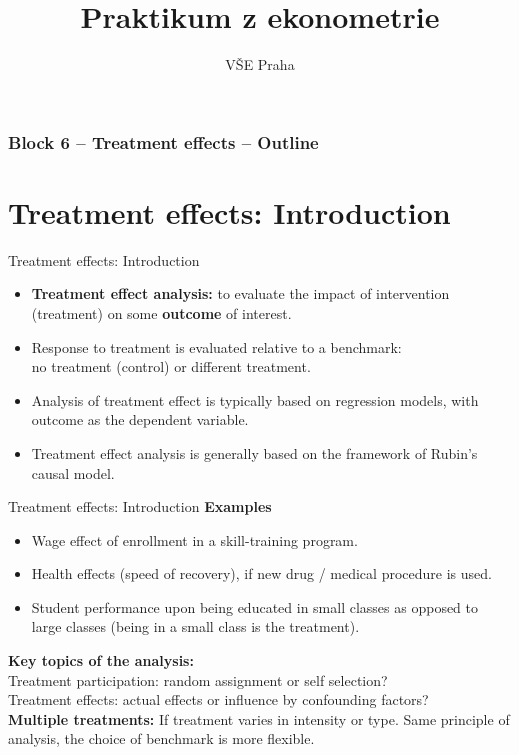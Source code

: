\documentclass{beamer}
\title[Block 6]{Praktikum z ekonometrie}
\author{VŠE Praha}
\institute[4EK417] 
{
\medskip
\textit{Tomáš Formánek} %
}
\date{} %
\begin{document}
\begin{frame}
\titlepage %
\end{frame}
\begin{frame}
\frametitle{Block 6 – Treatment effects – Outline
} 
\tableofcontents 
\end{frame}
\section{Treatment effects: Introduction}
\begin{frame}{Treatment effects: Introduction}
\begin{itemize}
    \item \textbf{Treatment effect analysis:} to evaluate the impact of intervention (treatment) on some \textbf{outcome} of interest.
    \bigskip
    \item Response to treatment is evaluated relative to a benchmark:  \\no treatment (control) or different treatment. 
    \bigskip
    \item Analysis of treatment effect is typically based on regression models, with outcome as the dependent variable.
    \bigskip
    \item Treatment effect analysis is generally based on the framework of Rubin's causal model. 
\end{itemize}
\end{frame}
\begin{frame}{Treatment effects: Introduction}
\textbf{Examples}\\ \medskip
\begin{itemize}
    \item Wage effect of enrollment in a skill-training program.
    \medskip
    \item Health effects (speed of recovery), if new drug / medical procedure is used.
    \medskip
    \item Student performance upon being educated in small classes as opposed to large classes (being in a small class is the treatment). 
\end{itemize}
\bigskip
\textbf{Key topics of the analysis:}\\
Treatment participation: random assignment or self selection?\\
Treatment effects: actual effects or influence by confounding factors?\\
\bigskip
\textbf{Multiple treatments:} If treatment varies in intensity or type. Same principle of analysis, the choice of benchmark is more flexible.
\end{frame}
\end{document}
